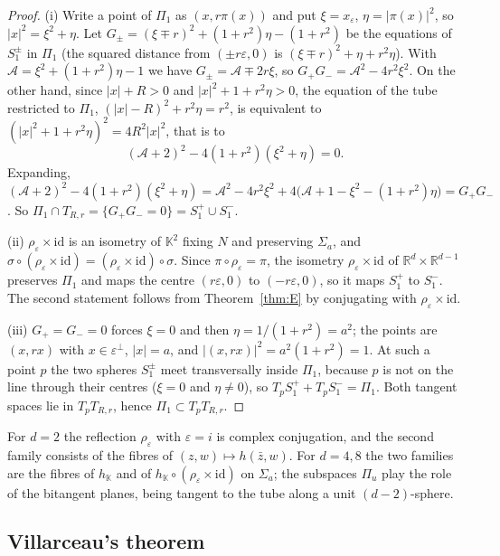 \documentclass[11pt]{amsart}
\numberwithin{equation}{section}
\theoremstyle{plain}
\theoremstyle{definition}
\theoremstyle{remark}
\newcommand{\R}{\mathbb{R}}
\newcommand{\K}{\mathbb{K}}
\begin{document}
\begin{proof}
(i) Write a point of $\Pi_1$ as $(x,r\pi(x))$ and put $\xi=x_\varepsilon$, $\eta=|\pi(x)|^2$, so $|x|^2=\xi^2+\eta$. Let $G_\pm=(\xi\mp r)^2+(1+r^2)\eta-(1+r^2)$ be the equations of $S_1^\pm$ in $\Pi_1$ (the squared distance from $(\pm r\varepsilon,0)$ is $(\xi\mp r)^2+\eta+r^2\eta$). With $\mathcal A=\xi^2+(1+r^2)\eta-1$ we have $G_\pm=\mathcal A\mp2r\xi$, so $G_+G_-=\mathcal A^2-4r^2\xi^2$. On the other hand, since $|x|+R>0$ and $|x|^2+1+r^2\eta>0$, the equation of the tube restricted to $\Pi_1$, $(|x|-R)^2+r^2\eta=r^2$, is equivalent to $(|x|^2+1+r^2\eta)^2=4R^2|x|^2$, that is to
\[
(\mathcal A+2)^2-4(1+r^2)(\xi^2+\eta)=0 .
\]
Expanding, $(\mathcal A+2)^2-4(1+r^2)(\xi^2+\eta)=\mathcal A^2-4r^2\xi^2+4\bigl(\mathcal A+1-\xi^2-(1+r^2)\eta\bigr)=G_+G_-$. So $\Pi_1\cap T_{R,r}=\{G_+G_-=0\}=S_1^+\cup S_1^-$.

(ii) $\rho_\varepsilon\times\mathrm{id}$ is an isometry of $\K^2$ fixing $N$ and preserving $\Sigma_a$, and $\sigma\circ(\rho_\varepsilon\times\mathrm{id})=(\rho_\varepsilon\times\mathrm{id})\circ\sigma$. Since $\pi\circ\rho_\varepsilon=\pi$, the isometry $\rho_\varepsilon\times\mathrm{id}$ of $\R^d\times\R^{d-1}$ preserves $\Pi_1$ and maps the centre $(r\varepsilon,0)$ to $(-r\varepsilon,0)$, so it maps $S_1^+$ to $S_1^-$. The second statement follows from Theorem~\ref{thm:E} by conjugating with $\rho_\varepsilon\times\mathrm{id}$.

(iii) $G_+=G_-=0$ forces $\xi=0$ and then $\eta=1/(1+r^2)=a^2$; the points are $(x,rx)$ with $x\in\varepsilon^\perp$, $|x|=a$, and $|(x,rx)|^2=a^2(1+r^2)=1$. At such a point $p$ the two spheres $S_1^\pm$ meet transversally inside $\Pi_1$, because $p$ is not on the line through their centres ($\xi=0$ and $\eta\neq0$), so $T_pS_1^++T_pS_1^-=\Pi_1$. Both tangent spaces lie in $T_pT_{R,r}$, hence $\Pi_1\subset T_pT_{R,r}$.
\end{proof}

For $d=2$ the reflection $\rho_\varepsilon$ with $\varepsilon=i$ is complex conjugation, and the second family consists of the fibres of $(z,w)\mapsto h(\bar z,w)$. For $d=4,8$ the two families are the fibres of $h_\K$ and of $h_\K\circ(\rho_\varepsilon\times\mathrm{id})$ on $\Sigma_a$; the subspaces $\Pi_u$ play the role of the bitangent planes, being tangent to the tube along a unit $(d-2)$-sphere.

\subsection{Villarceau's theorem}\label{sec:villarceau2}
\end{document}
